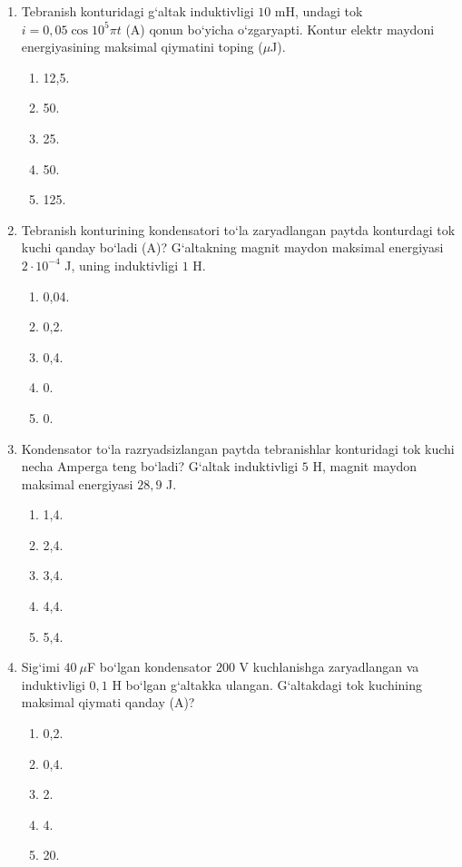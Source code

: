 \begin{enumerate}
\item Tebranish konturidagi g‘altak induktivligi $10$ mH, undagi tok $i=0,05\cos10^5\pi t$ (A) qonun bo‘yicha o‘zgaryapti. Kontur elektr maydoni energiyasining maksimal qiymatini toping ($\mu$J).
\begin{enumerate}[label=\Alph*)]
\item 12,5.
\item 50.
\item 25.
\item 50.
\item 125.
\end{enumerate}

\item Tebranish konturining kondensatori to‘la zaryadlangan paytda konturdagi tok kuchi qanday bo‘ladi (A)? G‘altakning magnit maydon maksimal energiyasi $2\cdot10^{-4}$ J, uning induktivligi $1$ H.
\begin{enumerate}[label=\Alph*)]
\item 0,04.
\item 0,2.
\item 0,4.
\item 0.
\item 0.
\end{enumerate}

\item Kondensator to‘la razryadsizlangan paytda tebranishlar konturidagi tok kuchi necha Amperga teng bo‘ladi? G‘altak induktivligi $5$ H, magnit maydon maksimal energiyasi $28,9$ J.
\begin{enumerate}[label=\Alph*)]
\item 1,4.
\item 2,4.
\item 3,4.
\item 4,4.
\item 5,4.
\end{enumerate}

\item Sig‘imi $40~\mu$F bo‘lgan kondensator $200$ V kuchlanishga zaryadlangan va induktivligi $0,1$ H bo‘lgan g‘altakka ulangan. G‘altakdagi tok kuchining maksimal qiymati qanday (A)?
\begin{enumerate}[label=\Alph*)]
\item 0,2.
\item 0,4.
\item 2.
\item 4.
\item 20.
\end{enumerate}


\end{enumerate}
